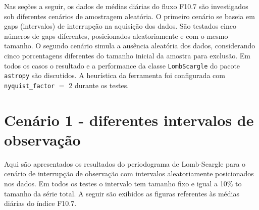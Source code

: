 \clearpage{}
Nas seções a seguir, os dados de médias diárias do fluxo F10.7 são investigados sob diferentes cenários de amostragem aleatória. O primeiro cenário se baseia em gaps (intervalos) de interrupção na aquisição dos dados. São testados cinco números de gaps diferentes, posicionados aleatoriamente e com o mesmo tamanho. O segundo cenário simula a ausência aleatória dos dados, considerando cinco porcentagens diferentes do tamanho inicial da amostra para exclusão. Em todos os casos o resultado e a performance da classe \texttt{LombScargle} do pacote \texttt{astropy} são discutidos. A heurística da ferramenta foi configurada com \texttt{nyquist\_factor} $=$ 2 durante os testes.

\section{Cenário 1 - diferentes intervalos de observação}

Aqui são apresentados os resultados do periodograma de Lomb-Scargle para o cenário de interrupção de observação com intervalos aleatoriamente posicionados nos dados. Em todos os testes o intervalo tem tamanho fixo e igual a 10\% to tamanho da série total. A seguir são exibidos as figuras referentes às médias diárias do índice F10.7. %


